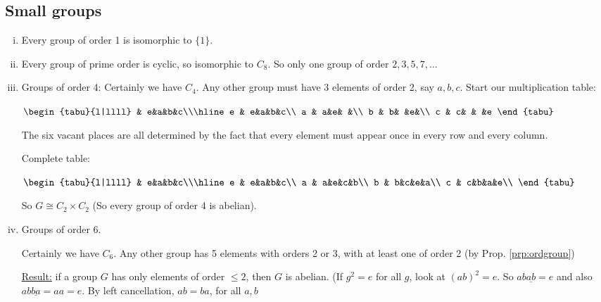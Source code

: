 \documentclass{article}
\theoremstyle{definition} \newtheorem*{definition}{Definition}
\newcommand{\ism}{\cong} \newcommand{\elemt}[2]{#1_{{#2}\sigma(#2)}}
\begin{document}
\subsection{Small groups} \begin{enumerate}[(i)] \item Every group of order 1 is
    isomorphic to $\{1\}$.  \item Every group of prime order is cyclic, so
      isomorphic to $C_8$. So only one group of order $2,3,5,7,\ldots$

\item Groups of order 4: Certainly we have $C_4$. Any other group must have 3
  elements of order 2, say $a,b,c$. Start our multiplication table:

    \begin{table} 
      $\begin{tabu}{l|llll} 
        & e&a&b&c\\\hline 
        e & e&a&b&c\\ 
        a & a&e& &\\ 
        b & b& &e&\\ 
        c & c& & &e 
      \end{tabu}$
    \end{table}

The six vacant places are all determined by the fact that every element must
appear once in every row and every column.

Complete table: \begin{table}[h] \centering $\begin{tabu}{l|llll} &
    e&a&b&c\\\hline e & e&a&b&c\\ a & a&e&c&b\\ b & b&c&e&a\\ c & c&b&a&e\\
  \end{tabu}$ \label{tab:completesimpletable} \end{table}

So $G \ism C_2 \times C_2$ (So every group of order 4 is abelian).

\item Groups of order 6.

  Certainly we have $C_6$. Any other group has 5 elements with orders 2 or 3,
  with at least one of order 2 (by Prop. \ref{prp:ordgroup})

  \underline{Result:} if a group $G$ has only elements of order $\leq 2$, then
  $G$ is abelian. (If $g^2 = e$ for all $g$, look at $(ab)^2 = e$. So
  $ab\underline{ab}=e$ and also $ab\underline{ba}=aa=e$. By left cancellation,
  $ab=ba$, for all $a,b$


\end{enumerate}
\end{document}
